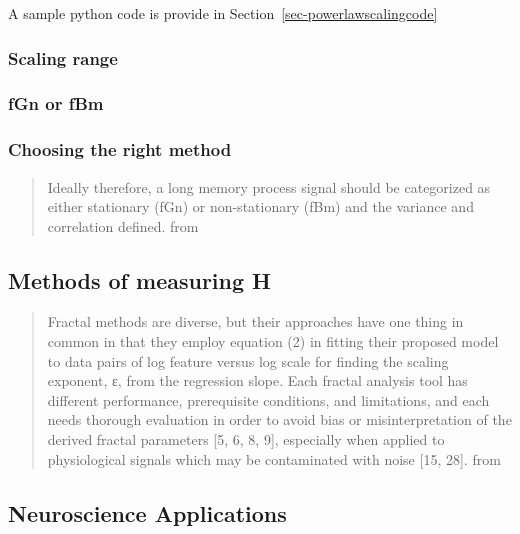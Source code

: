 \documentclass[
  sn-vancouver,
  Numbered,
  referee,
  lineno]{sn-jnl}
\begin{document}
A sample python code is provide in Section~\ref{sec-powerlawscalingcode}

\subsubsection{Scaling range}\label{scaling-range-3}

\subsubsection{fGn or fBm}\label{fgn-or-fbm-2}

\subsubsection{Choosing the right
method}\label{choosing-the-right-method-2}

\begin{quote}
Ideally therefore, a long memory process signal should be categorized as
either stationary (fGn) or non-stationary (fBm) and the variance and
correlation defined. from \citep{ekePhysiologicalTimeSeries2000}
\end{quote}

\subsection{Methods of measuring H}\label{methods-of-measuring-h-2}

\begin{quote}
Fractal methods are diverse, but their approaches have one thing in
common in that they employ equation (2) in fitting their proposed model
to data pairs of log feature versus log scale for finding the scaling
exponent, ε, from the regression slope. Each fractal analysis tool has
different performance, prerequisite conditions, and limitations, and
each needs thorough evaluation in order to avoid bias or
misinterpretation of the derived fractal parameters {[}5, 6, 8, 9{]},
especially when applied to physiological signals which may be
contaminated with noise {[}15, 28{]}. from
\citep{ekePhysiologicalTimeSeries2000}
\end{quote}

\subsection{Neuroscience
Applications}\label{neuroscience-applications-2}
\end{document}

